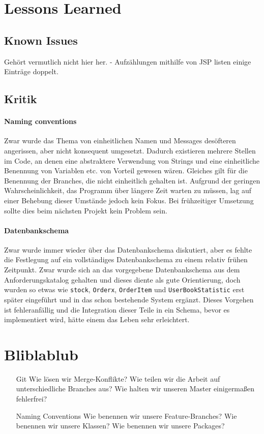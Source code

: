 \section{Lessons Learned}

\subsection{Known Issues}

Gehört vermutlich nicht hier her.
- Aufzählungen mithilfe von JSP listen einige Einträge doppelt.

\subsection{Kritik}

\paragraph{Naming conventions} Zwar wurde das Thema von einheitlichen Namen und Messages desöfteren angerissen, aber nicht konsequent umgesetzt. Dadurch existieren mehrere Stellen im Code, an denen eine abstraktere Verwendung von Strings und eine einheitliche Benennung von Variablen etc. von Vorteil gewesen wären. Gleiches gilt für die Benennung der Branches, die nicht einheitlich gehalten ist. Aufgrund der geringen Wahrscheinlichkeit, das Programm über längere Zeit warten zu müssen, lag auf einer Behebung dieser Umstände jedoch kein Fokus. Bei frühzeitiger Umsetzung sollte dies beim nächsten Projekt kein Problem sein.

\paragraph{Datenbankschema} Zwar wurde immer wieder über das Datenbankschema diskutiert, aber es fehlte die Festlegung auf ein vollständiges Datenbankschema zu einem relativ frühen Zeitpunkt. Zwar wurde sich an das vorgegebene Datenbankschema aus dem Anforderungskatalog gehalten und dieses diente als gute Orientierung, doch wurden so etwas wie \texttt{stock}, \texttt{Orderx}, \texttt{OrderItem} und \texttt{UserBookStatistic} erst später eingeführt und in das schon bestehende System ergänzt. Dieses Vorgehen ist fehleranfällig und die Integration dieser Teile in ein Schema, bevor es implementiert wird, hätte einem das Leben sehr erleichtert.

\section{Bliblablub}

	\begin{itemize}
		\item[Git] Wie lösen wir Merge-Konflikte? Wie teilen wir die Arbeit auf unterschiedliche Branches aus? Wie halten wir unseren Master einigermaßen fehlerfrei?
		\item[Naming Conventions] Wie benennen wir unsere Feature-Branches? Wie benennen wir unsere Klassen? Wie benennen wir unsere Packages?
	\end{itemize}